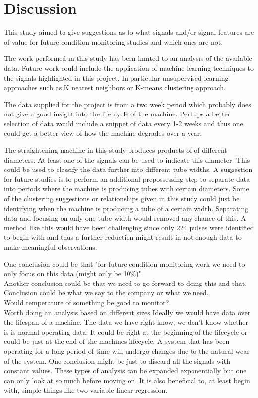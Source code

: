 \documentclass[]{article}
\begin{document}
\clearpage 

\section{Discussion}
This study aimed to give suggestions as to what signals and/or signal features are of value for future condition monitoring studies and which ones are not.

The work performed in this study has been limited to an analysis of the available data. Future work could include the application of machine learning techniques to the signals highlighted in this project. In particular unsupervised learning approaches such as K nearest neighbors or K-means clustering approach.

The data supplied for the project is from a two week period which probably does not give a good insight into the life cycle of the machine. Perhaps a better selection of data would include a snippet of data every 1-2 weeks and thus one could get a better view of how the machine degrades over a year.

The straightening machine in this study produces products of of different diameters. At least one of the signals can be used to indicate this diameter. This could be used to classify the data further into different tube widths. A suggestion for future studies is to perform an additional prepossessing step to separate data into periods where the machine is producing tubes with certain diameters. Some of the clustering suggestions or relationships given in this study could just be identifying when the machine is producing a tube of a certain width. Separating data and focusing on only one tube width would removed any chance of this. A method like this would have been challenging since only 224 pulses were identified to begin with and thus a further reduction might result in not enough data to make meaningful observations.

One conclusion could be that "for future condition monitoring work we need to only focus on this data (might only be 10\%)".\\
Another conclusion could be that we need to go forward to doing this and that.\\
Conclusion could be what we say to the company or what we need.\\
Would temperature of something be good to monitor?\\
Worth doing an analysis based on different sizes
Ideally we would have data over the lifespan of a machine. The data we have right know, we don't know whether is is normal operating data. It could be right at the beginning of the lifecycle or could be just at the end of the machines lifecycle. A system that has been operating for a long period of time will undergo changes due to the natural wear of the system.
One conclusion might be just to discard all the signals with constant values.
These types of analysis can be expanded exponentially but one can only look at so much before moving on. It is also beneficial to, at least begin with, simple things like two variable linear regression.
\end{document}
